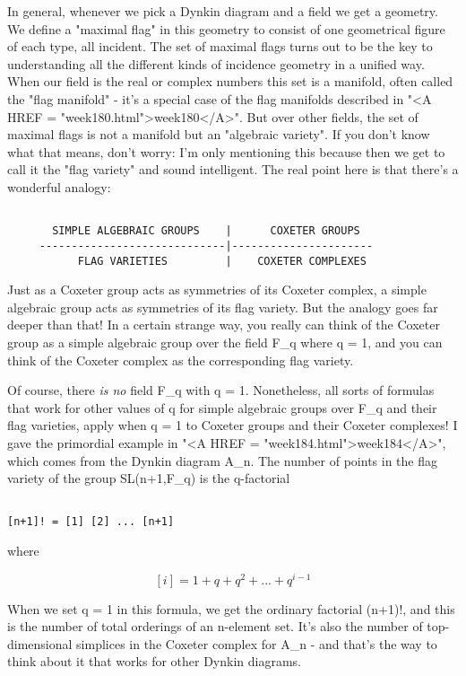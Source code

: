 In general, whenever we pick a Dynkin diagram and a field we get a
geometry.  We define a "maximal flag" in this geometry to
consist of one geometrical figure of each type, all incident.  The set
of maximal flags turns out to be the key to understanding all the
different kinds of incidence geometry in a unified way.  When our field
is the real or complex numbers this set is a manifold, often called the
"flag manifold" - it's a special case of the flag manifolds
described in "<A HREF = "week180.html">week180</A>".  But over
other fields, the set of maximal flags is not a manifold but an
"algebraic variety".  If you don't know what that means, don't
worry: I'm only mentioning this because then we get to call it the
"flag variety" and sound intelligent.  The real point here is
that there's a wonderful analogy:


\begin{verbatim}

       SIMPLE ALGEBRAIC GROUPS    |      COXETER GROUPS
     -----------------------------|----------------------
           FLAG VARIETIES         |    COXETER COMPLEXES
\end{verbatim}
    
Just as a Coxeter group acts as symmetries of its Coxeter complex,
a simple algebraic group acts as symmetries of its flag variety.  
But the analogy goes far deeper than that!  In a certain strange way, 
you really can think of the Coxeter group as a simple algebraic 
group over the field F_{q} where q = 1, and you can think of the Coxeter
complex as the corresponding flag variety.

Of course, there \emph{is no} field F_{q} with q = 1.  Nonetheless, all
sorts of formulas that work for other values of q for simple algebraic
groups over F_{q} and their flag varieties, apply when q = 1 to Coxeter
groups and their Coxeter complexes!  I gave the primordial example in
"<A HREF = "week184.html">week184</A>", which comes from the
Dynkin diagram A_{n}.  The number of points in the flag variety
of the group SL(n+1,F_{q}) is the q-factorial


\begin{verbatim}

[n+1]! = [1] [2] ... [n+1]
\end{verbatim}
    
where


$$

[i] = 1 + q + q^{2} + ... + q^{i-1}
$$
    
When we set q = 1 in this formula, we get the ordinary factorial
(n+1)!, and this is the number of total orderings of an n-element set.
It's also the number of top-dimensional simplices in the Coxeter 
complex for A_{n} - and that's the way to think about it that works for
other Dynkin diagrams.


